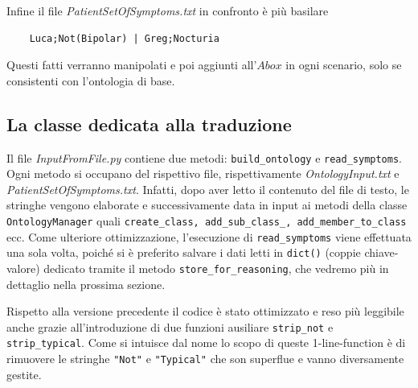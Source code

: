 Infine il file \emph{PatientSetOfSymptoms.txt} in confronto è più basilare
\begin{verbatim}
	Luca;Not(Bipolar) | Greg;Nocturia
\end{verbatim} 
Questi fatti verranno manipolati e poi aggiunti all'$ Abox$ in ogni scenario, solo se consistenti con l'ontologia di base.

\subsection{La classe dedicata alla traduzione} \label{subSec: InputFile}
Il file \emph{InputFromFile.py} contiene due metodi:
\texttt{build_ontology} e \texttt{read_symptoms}.
Ogni metodo si occupano del rispettivo file, rispettivamente \emph{OntologyInput.txt} e \emph{PatientSetOfSymptoms.txt}.
Infatti, dopo aver letto il contenuto del file di testo,
le stringhe vengono elaborate e successivamente data in input ai metodi della classe \texttt{OntologyManager} quali 
\texttt{create_class, add_sub_class_, add_member_to_class} ecc.
Come ulteriore ottimizzazione, l'esecuzione di \texttt{read_symptoms} viene effettuata una sola volta, poiché
si è preferito salvare i dati letti in \texttt{dict()} (coppie chiave-valore) dedicato tramite il metodo
\texttt{store_for_reasoning}, che vedremo più in dettaglio nella prossima sezione.

Rispetto alla versione precedente il codice è stato ottimizzato e reso più leggibile anche grazie all'introduzione
di due funzioni ausiliare \texttt{strip_not} e \texttt{strip_typical}.
Come si intuisce dal nome lo scopo di queste 1-line-function è di rimuovere le stringhe \texttt{"Not"}
e \texttt{"Typical"} che son superflue e vanno diversamente gestite.


